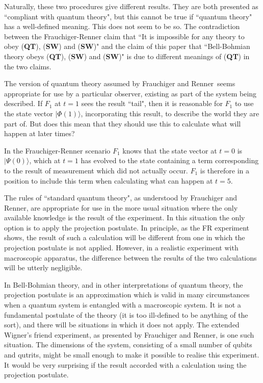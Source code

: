 \documentclass[12pt,a4paper,reqno]{article}
\renewcommand{\(}{\left(}
\renewcommand{\)}{\right)}
\renewcommand{\.}{\centerdot}
\newcommand{\1}{\mathbf{1}}
\newcommand{\<}{\langle}
\renewcommand{\>}{\rangle}
\newcommand{\FR}{Frauchiger and Renner}
\theoremstyle{definition}
\theoremstyle{remark}
\numberwithin{equation}{section}
\begin{document}
Naturally, these two procedures give different results. They are both presented as ``compliant with quantum theory", but this cannot be true if ``quantum theory" has a well-defined meaning. This does not seem to be so. The contradiction between the Frauchiger-Renner claim that ``It is impossible for any theory to obey ({\bf QT}), ({\bf SW}) and ({\bf SW})" and the claim of this paper that ``Bell-Bohmian theory obeys ({\bf QT}), ({\bf SW}) and ({\bf SW})" is due to different meanings of ({\bf QT}) in the two claims.

The version of quantum theory assumed by \FR \ seems appropriate for use by a particular observer, existing as part of the system being described. If $F_1$ at $t = 1$ sees the result ``tail", then it is reasonable for $F_1$ to use the state vector $|\Phi(1)\>$, incorporating this result, to describe the world they are part of. But does this mean that they should use this to calculate what will happen at later times? 

In the Frauchiger-Renner scenario $F_1$ knows that the state vector at $t = 0$ is $|\Psi(0)\>$, which at $t = 1$ has evolved to the state containing a term corresponding to the result of measurement which did not actually occur. $F_1$ is therefore in a position to include this term when calculating what can happen at $t = 5$. 

The rules of ``standard quantum theory", as understood by \FR, are appropriate for use in the more usual situation where the only available knowledge is the result of the experiment. In this situation the only option is to apply the projection postulate. In principle, as the FR experiment shows, the result of such a calculation will be different from one in which the projection postulate is not applied. However, in a realistic experiment with macroscopic apparatus, the difference between the results of the two calculations will be utterly negligible. 

In Bell-Bohmian theory, and in other interpretations of quantum theory, the projection postulate is an approximation which is valid in many circumstances when a quantum system is entangled with a macroscopic system. It is not a fundamental postulate of the theory (it is too ill-defined to be anything of the sort), and there will be situations in which it does not apply. The extended Wigner's friend experiment, as presented by \FR, is one such situation. The dimensions of the system, consisting of a small number of qubits and qutrits, might be small enough to make it possible to realise this experiment. It would be very surprising if the result accorded with a calculation using the projection postulate. 
\end{document}

